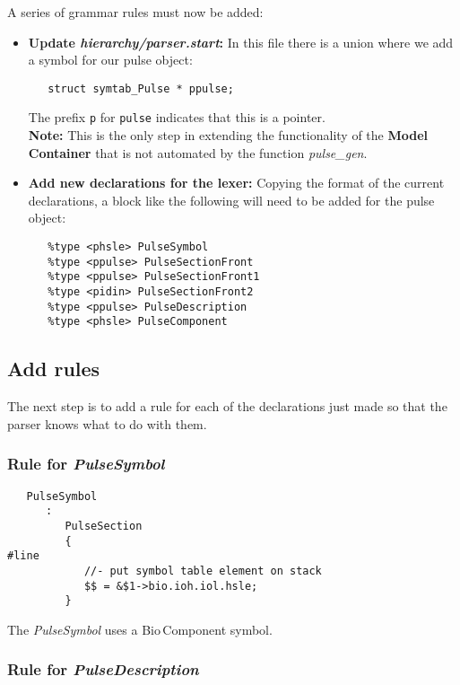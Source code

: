 \documentclass[12pt]{article}
\begin{document}
A series of grammar rules must now be added:
\begin{itemize}
   \item[]{\bf Update {\it hierarchy/parser.start}:} In this file there is a union where we add a symbol for our pulse object:
\begin{verbatim}
   struct symtab_Pulse * ppulse;
\end{verbatim}
The prefix {\tt p} for {\tt pulse} indicates that this is a pointer. \\
{\bf Note:} This is the only step in extending the functionality of the {\bf Model\,Container} that is not automated by the function {\it pulse\_gen}.

   \item[]{\bf Add new declarations for the lexer:} Copying the format of the current declarations, a block like the following will need to be added for the pulse object:
\begin{verbatim}
   %type <phsle> PulseSymbol
   %type <ppulse> PulseSectionFront
   %type <ppulse> PulseSectionFront1
   %type <pidin> PulseSectionFront2
   %type <ppulse> PulseDescription
   %type <phsle> PulseComponent
\end{verbatim}
\end{itemize}

\subsection*{Add rules}

The next step is to add a rule for each of the declarations just made so that the parser knows what to do with them.

\subsubsection*{Rule for {\it PulseSymbol}}

\begin{verbatim}
   PulseSymbol
      :
         PulseSection
         {
#line
            //- put symbol table element on stack
            $$ = &$1->bio.ioh.iol.hsle;
         }
\end{verbatim}
The {\it PulseSymbol} uses a Bio\,Component symbol.

\subsubsection*{Rule for {\it PulseDescription}}
\end{document}
